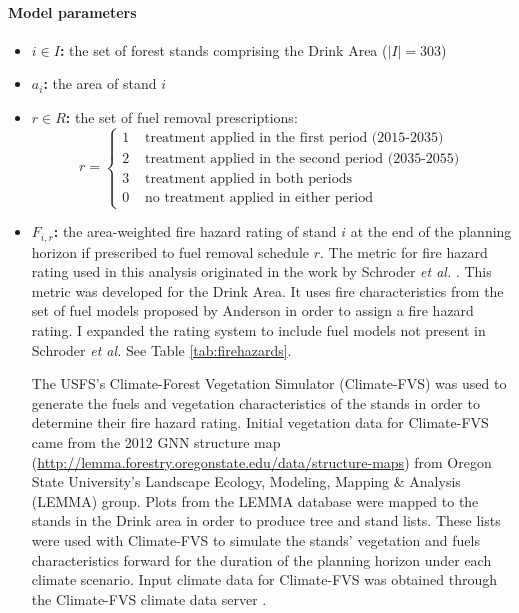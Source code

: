 \paragraph{Model parameters}
\begin{itemize}
\item \textbf{$i \in I$:} the set of forest stands comprising the Drink Area ($|I| = 303$)

\item \textbf{$a_i$:} the area of stand $i$

\item \textbf{$r \in R$:} the set of fuel removal prescriptions:
	$$
	r =
	\begin{cases}
	1 &\text{ treatment applied in the first period (2015-2035)}\\
	2 &\text{ treatment applied in the second period (2035-2055)}\\
	3 &\text{ treatment applied in both periods}\\
	0 &\text{ no treatment applied in either period}
	\end{cases}
	$$
	
\item \textbf{$F_{i,r}$:} the area-weighted fire hazard rating of stand $i$ at the end of the planning horizon if prescribed to fuel removal schedule $r$. The metric for fire hazard rating used in this analysis originated in the work by Schroder \textit{et al.} \cite{schroder2016multi}. This metric was developed for the Drink Area. It uses fire characteristics from the set of fuel models proposed by Anderson \cite{anderson1982aids} in order to assign a fire hazard rating. I expanded the rating system to include fuel models not present in Schroder \textit{et al.} See Table \ref{tab:firehazards}.

The USFS's Climate-Forest Vegetation Simulator (Climate-FVS) was used to generate the fuels and vegetation characteristics of the stands in order to determine their fire hazard rating. Initial vegetation data for Climate-FVS came from the 2012 GNN structure map (\url{http://lemma.forestry.oregonstate.edu/data/structure-maps}) from Oregon State University's Landscape Ecology, Modeling, Mapping \& Analysis (LEMMA) group. Plots from the LEMMA database were mapped to the stands in the Drink area in order to produce tree and stand lists. These lists were used with Climate-FVS to simulate the stands' vegetation and fuels characteristics forward for the duration of the planning horizon under each climate scenario. Input climate data for Climate-FVS was obtained through the Climate-FVS climate data server \cite{climateFVSReadyData}.


\end{itemize}
